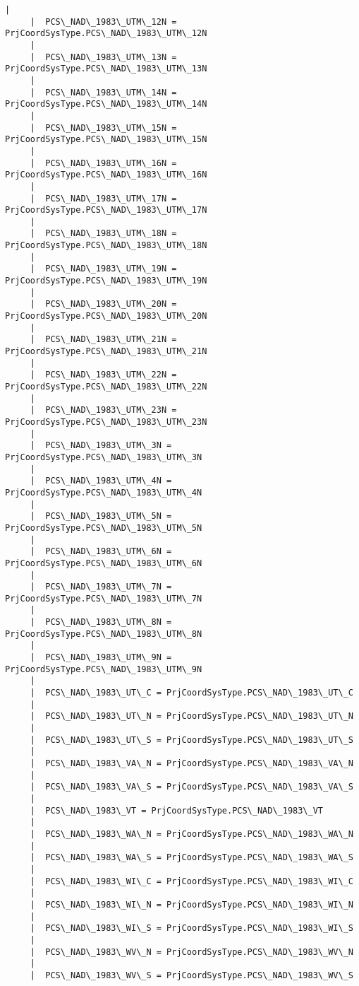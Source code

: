 \documentclass[11pt]{article}
\begin{document}
\begin{Verbatim}[commandchars=\\\{\}]
     |  
     |  PCS\_NAD\_1983\_UTM\_12N = PrjCoordSysType.PCS\_NAD\_1983\_UTM\_12N
     |  
     |  PCS\_NAD\_1983\_UTM\_13N = PrjCoordSysType.PCS\_NAD\_1983\_UTM\_13N
     |  
     |  PCS\_NAD\_1983\_UTM\_14N = PrjCoordSysType.PCS\_NAD\_1983\_UTM\_14N
     |  
     |  PCS\_NAD\_1983\_UTM\_15N = PrjCoordSysType.PCS\_NAD\_1983\_UTM\_15N
     |  
     |  PCS\_NAD\_1983\_UTM\_16N = PrjCoordSysType.PCS\_NAD\_1983\_UTM\_16N
     |  
     |  PCS\_NAD\_1983\_UTM\_17N = PrjCoordSysType.PCS\_NAD\_1983\_UTM\_17N
     |  
     |  PCS\_NAD\_1983\_UTM\_18N = PrjCoordSysType.PCS\_NAD\_1983\_UTM\_18N
     |  
     |  PCS\_NAD\_1983\_UTM\_19N = PrjCoordSysType.PCS\_NAD\_1983\_UTM\_19N
     |  
     |  PCS\_NAD\_1983\_UTM\_20N = PrjCoordSysType.PCS\_NAD\_1983\_UTM\_20N
     |  
     |  PCS\_NAD\_1983\_UTM\_21N = PrjCoordSysType.PCS\_NAD\_1983\_UTM\_21N
     |  
     |  PCS\_NAD\_1983\_UTM\_22N = PrjCoordSysType.PCS\_NAD\_1983\_UTM\_22N
     |  
     |  PCS\_NAD\_1983\_UTM\_23N = PrjCoordSysType.PCS\_NAD\_1983\_UTM\_23N
     |  
     |  PCS\_NAD\_1983\_UTM\_3N = PrjCoordSysType.PCS\_NAD\_1983\_UTM\_3N
     |  
     |  PCS\_NAD\_1983\_UTM\_4N = PrjCoordSysType.PCS\_NAD\_1983\_UTM\_4N
     |  
     |  PCS\_NAD\_1983\_UTM\_5N = PrjCoordSysType.PCS\_NAD\_1983\_UTM\_5N
     |  
     |  PCS\_NAD\_1983\_UTM\_6N = PrjCoordSysType.PCS\_NAD\_1983\_UTM\_6N
     |  
     |  PCS\_NAD\_1983\_UTM\_7N = PrjCoordSysType.PCS\_NAD\_1983\_UTM\_7N
     |  
     |  PCS\_NAD\_1983\_UTM\_8N = PrjCoordSysType.PCS\_NAD\_1983\_UTM\_8N
     |  
     |  PCS\_NAD\_1983\_UTM\_9N = PrjCoordSysType.PCS\_NAD\_1983\_UTM\_9N
     |  
     |  PCS\_NAD\_1983\_UT\_C = PrjCoordSysType.PCS\_NAD\_1983\_UT\_C
     |  
     |  PCS\_NAD\_1983\_UT\_N = PrjCoordSysType.PCS\_NAD\_1983\_UT\_N
     |  
     |  PCS\_NAD\_1983\_UT\_S = PrjCoordSysType.PCS\_NAD\_1983\_UT\_S
     |  
     |  PCS\_NAD\_1983\_VA\_N = PrjCoordSysType.PCS\_NAD\_1983\_VA\_N
     |  
     |  PCS\_NAD\_1983\_VA\_S = PrjCoordSysType.PCS\_NAD\_1983\_VA\_S
     |  
     |  PCS\_NAD\_1983\_VT = PrjCoordSysType.PCS\_NAD\_1983\_VT
     |  
     |  PCS\_NAD\_1983\_WA\_N = PrjCoordSysType.PCS\_NAD\_1983\_WA\_N
     |  
     |  PCS\_NAD\_1983\_WA\_S = PrjCoordSysType.PCS\_NAD\_1983\_WA\_S
     |  
     |  PCS\_NAD\_1983\_WI\_C = PrjCoordSysType.PCS\_NAD\_1983\_WI\_C
     |  
     |  PCS\_NAD\_1983\_WI\_N = PrjCoordSysType.PCS\_NAD\_1983\_WI\_N
     |  
     |  PCS\_NAD\_1983\_WI\_S = PrjCoordSysType.PCS\_NAD\_1983\_WI\_S
     |  
     |  PCS\_NAD\_1983\_WV\_N = PrjCoordSysType.PCS\_NAD\_1983\_WV\_N
     |  
     |  PCS\_NAD\_1983\_WV\_S = PrjCoordSysType.PCS\_NAD\_1983\_WV\_S

\end{Verbatim}
\end{document}
